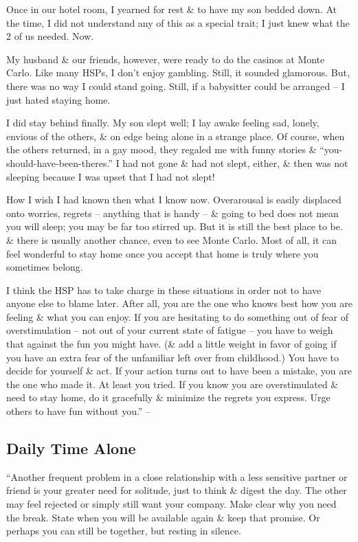 \documentclass{article}
\numberwithin{equation}{section}
\begin{document}
Once in our hotel room, I yearned for rest \& to have my son bedded down. At the time, I did not understand any of this as a special trait; I just knew what the 2 of us needed. Now.

My husband \& our friends, however, were ready to do the casinos at Monte Carlo. Like many HSPs, I don't enjoy gambling. Still, it sounded glamorous. But, there was no way I could stand going. Still, if a babysitter could be arranged -- I just hated staying home.

I did stay behind finally. My son slept well; I lay awake feeling sad, lonely, envious of the others, \& on edge being alone in a strange place. Of course, when the others returned, in a gay mood, they regaled me with funny stories \& ``you-should-have-been-theres.'' I had not gone \& had not slept, either, \& then was not sleeping because I was upset that I had not slept!

How I wish I had known then what I know now. Overarousal is easily displaced onto worries, regrets -- anything that is handy -- \& going to bed does not mean you will sleep; you may be far too stirred up. But it is still the best place to be. \& there is usually another chance, even to see Monte Carlo. Most of all, it can feel wonderful to stay home once you accept that home is truly where you sometimes belong.

I think the HSP has to take charge in these situations in order not to have anyone else to blame later. After all, you are the one who knows best how you are feeling \& what you can enjoy. If you are hesitating to do something out of fear of overstimulation -- not out of your current state of fatigue -- you have to weigh that against the fun you might have. (\& add a little weight in favor of going if you have an extra fear of the unfamiliar left over from childhood.) You have to decide for yourself \& act. If your action turns out to have been a mistake, you are the one who made it. At least you tried. If you know you are overstimulated \& need to stay home, do it gracefully \& minimize the regrets you express. Urge others to have fun without you.'' -- \cite[pp. 184--186]{Aron2013}

\subsection{Daily Time Alone}
``Another frequent problem in a close relationship with a less sensitive partner or friend is your greater need for solitude, just to think \& digest the day. The other may feel rejected or simply still want your company. Make clear why you need the break. State when you will be available again \& keep that promise. Or perhaps you can still be together, but resting in silence.
\end{document}
